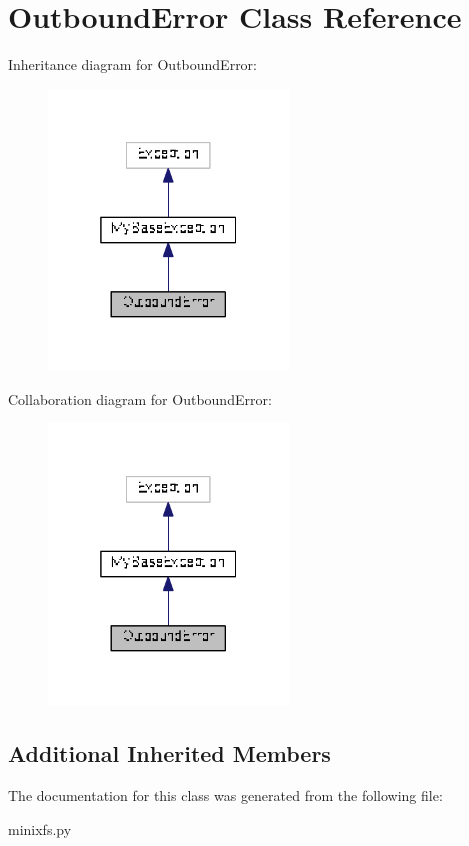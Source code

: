 \hypertarget{classminixfs_1_1_outbound_error}{}\section{Outbound\+Error Class Reference}
\label{classminixfs_1_1_outbound_error}


Inheritance diagram for Outbound\+Error\+:
\nopagebreak
\begin{figure}[H]
\begin{center}
\leavevmode
\includegraphics[width=181pt]{classminixfs_1_1_outbound_error__inherit__graph}
\end{center}
\end{figure}


Collaboration diagram for Outbound\+Error\+:
\nopagebreak
\begin{figure}[H]
\begin{center}
\leavevmode
\includegraphics[width=181pt]{classminixfs_1_1_outbound_error__coll__graph}
\end{center}
\end{figure}
\subsection*{Additional Inherited Members}


The documentation for this class was generated from the following file\+:\begin{DoxyCompactItemize}
\item 
minixfs.\+py\end{DoxyCompactItemize}
